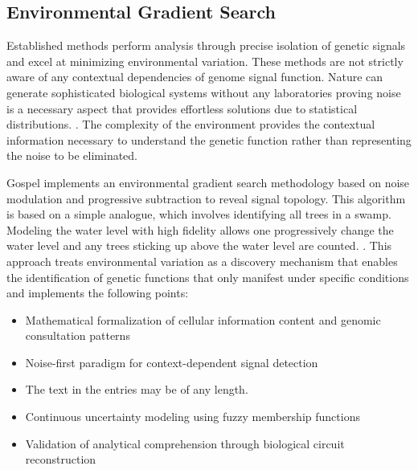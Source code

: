 \documentclass[12pt,a4paper]{article}
\begin{document}
\subsection{Environmental Gradient Search}
Established methods perform analysis through precise isolation of genetic signals and excel at minimizing environmental variation. These methods are not strictly aware of any contextual dependencies of genome signal function. Nature can generate sophisticated biological systems without any laboratories proving noise is a necessary aspect that provides effortless solutions due to statistical distributions.
\cite{fiehn2002metabolomics, patti2012innovation}. The complexity of the environment provides the contextual information necessary to understand the genetic function rather than representing the noise to be eliminated.

Gospel implements an environmental gradient search methodology based on noise modulation and progressive subtraction to reveal signal topology. This algorithm is based on a simple analogue, which involves identifying all trees in a swamp. Modeling the water level with high fidelity allows one progressively change the water level and any trees sticking up above the water level are counted. \cite{wishart2018hmdb, smith2006xcms}. This approach treats environmental variation as a discovery mechanism that enables the identification of genetic functions that only manifest under specific conditions and implements the following points:

\begin{itemize}
  \item Mathematical formalization of cellular information content and genomic consultation patterns
  \item Noise-first paradigm for context-dependent signal detection
  \item The text in the entries may be of any length.
  \item Continuous uncertainty modeling using fuzzy membership functions
  \item Validation of analytical comprehension through biological circuit reconstruction
\end{itemize}
\end{document}
